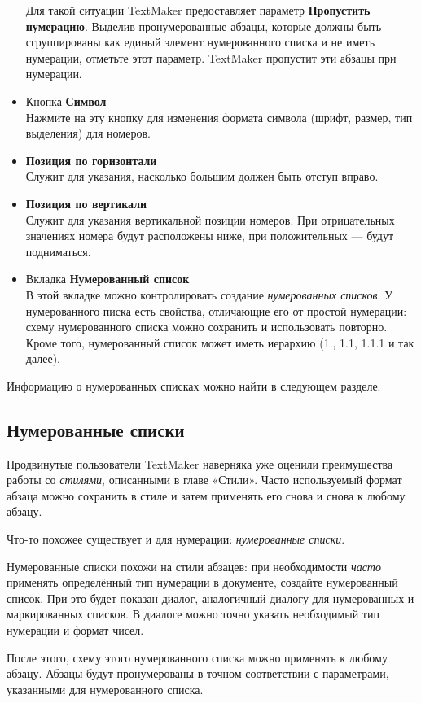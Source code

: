 \documentclass[a4paper,10pt]{article}
\begin{document}
\begin{itemize}
 Для такой ситуации TextMaker предоставляет параметр \textbf{Пропустить нумерацию}. Выделив пронумерованные абзацы, которые должны быть сгруппированы как единый элемент нумерованного списка и не иметь нумерации, отметьте этот параметр. TextMaker пропустит эти абзацы при нумерации.
 \item Кнопка \textbf{Символ}\\
 Нажмите на эту кнопку для изменения формата символа (шрифт, размер, тип выделения) для номеров.
 \item \textbf{Позиция по горизонтали}\\
 Служит для указания, насколько большим должен быть отступ вправо.
 \item \textbf{Позиция по вертикали}\\
 Служит для указания вертикальной позиции номеров. При отрицательных значениях номера будут расположены ниже, при положительных --- будут подниматься.
 \item Вкладка \textbf{Нумерованный список}\\
 В этой вкладке можно контролировать создание \textit{нумерованных списков}. У нумерованного писка есть свойства, отличающие его от простой нумерации: схему нумерованного списка можно сохранить и использовать повторно. Кроме того, нумерованный список может иметь иерархию (1., 1.1, 1.1.1 и так далее).
\end{itemize}

Информацию о нумерованных списках можно найти в следующем разделе.

\subsection{Нумерованные списки}
Продвинутые пользователи TextMaker наверняка уже оценили преимущества работы со \textit{стилями}, описанными в главе «Стили». Часто используемый формат абзаца можно сохранить в стиле и затем применять его снова и снова к любому абзацу.

Что-то похожее существует и для нумерации: \textit{нумерованные списки}.

Нумерованные списки похожи на стили абзацев: при необходимости \textit{часто} применять определённый тип нумерации в документе, создайте нумерованный список. При это будет показан диалог, аналогичный диалогу для нумерованных и маркированных списков. В диалоге можно точно указать необходимый тип нумерации и формат чисел.

После этого, схему этого нумерованного списка можно применять к любому абзацу. Абзацы будут пронумерованы в точном соответствии с параметрами, указанными для нумерованного списка.
\end{document}
